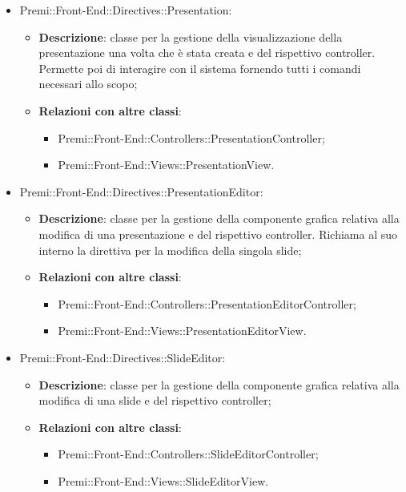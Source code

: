 \begin{itemize}
    \item Premi::Front-End::Directives::Presentation:
	\begin{itemize}
		\item \textbf{Descrizione}: classe per la gestione della visualizzazione della presentazione una volta che è stata creata e del rispettivo controller. Permette poi di interagire con il sistema fornendo tutti i comandi necessari allo scopo;
		\item \textbf{Relazioni con altre classi}:
		\begin{itemize}
			\item Premi::Front-End::Controllers::PresentationController;
			\item Premi::Front-End::Views::PresentationView.
		\end{itemize}
	\end{itemize}

    \item Premi::Front-End::Directives::PresentationEditor:
	\begin{itemize}
		\item \textbf{Descrizione}: classe per la gestione della componente grafica relativa alla modifica di una presentazione e del rispettivo controller. Richiama al suo interno la direttiva per la modifica della singola slide;
		\item \textbf{Relazioni con altre classi}:
		\begin{itemize}
			\item Premi::Front-End::Controllers::PresentationEditorController;
			\item Premi::Front-End::Views::PresentationEditorView.
		\end{itemize}
	\end{itemize}

    \item Premi::Front-End::Directives::SlideEditor:
	\begin{itemize}
		\item \textbf{Descrizione}: classe per la gestione della componente grafica relativa alla modifica di una slide e del rispettivo controller;
		\item \textbf{Relazioni con altre classi}:
		\begin{itemize}
			\item Premi::Front-End::Controllers::SlideEditorController;
			\item Premi::Front-End::Views::SlideEditorView.
		\end{itemize}
	\end{itemize}


\end{itemize}
